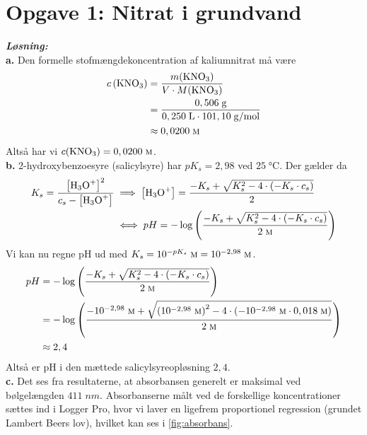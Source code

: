 \documentclass{report}
\newcommand{\sol}{\setlength{\parindent}{0cm}\textbf{\textit{Løsning:}}\setlength{\parindent}{1cm}}
\begin{document}
\section*{Opgave 1: Nitrat i grundvand}
\sol \\
\textbf{a.}
Den formelle stofmængdekoncentration af kaliumnitrat må være
\begin{equation*}
\begin{split}
  c \left(\ce{KNO3} \right) &=\frac{m(\ce{KNO3} ) }{V\cdot M(\ce{KNO3} )}\\
  &=\frac{0,506 \;\unit{g} }{0,250 \;\unit{L} \cdot 101,10 \;\unit{g/mol} }\\
  &\approx 0,0200 \;\unit{\textsc{m}} 
\end{split}
\end{equation*}
Altså har vi $c(\ce{KNO3})=0,0200 \;\unit{\textsc{m}} $.\\[1ex]
\textbf{b.}
2-hydroxybenzoesyre (salicylsyre) har $pK_s=2,98$ ved $25 \;\unit{\celsius} $.
Der gælder da
\begin{equation*}
\begin{split}
  K_s=\frac{\left[\ce{H3O+} \right]^2}{c_s-\left[\ce{H3O+} \right]} &\implies \left[\ce{H3O+} \right]=\frac{-K_s + \sqrt{K_s^2 - 4 \cdot \left(-K_s \cdot c_s\right) } }{2}\\
  &\iff pH=- \log\left(\frac{-K_s + \sqrt{K_s^2 - 4 \cdot \left(-K_s \cdot c_s\right) } }{2 \;\unit{\textsc{m}} }\right) 
\end{split}
\end{equation*}
Vi kan nu regne pH ud med $K_s=10^{-pK_s} \;\unit{\textsc{m}} =10^{-2,98} \;\unit{\textsc{m}} $.
\begin{equation*}
\begin{split}
  pH&=- \log\left(\frac{-K_s + \sqrt{K_s^2 - 4 \cdot \left(-K_s \cdot c_s\right) } }{2 \;\unit{\textsc{m}} }\right) \\
  &=- \log\left(\frac{-10 ^{-2,98} \;\unit{\textsc{m}} +\sqrt{\left(10 ^{-2,98} \;\unit{\textsc{m}} \right)^2 - 4 \cdot \left(-10 ^{-2,98} \;\unit{\textsc{m}} \cdot 0,018 \;\unit{\textsc{m}} \right) } }{2 \;\unit{\textsc{m}} }\right) \\
  &\approx 2,4
\end{split}
\end{equation*}
Altså er pH i den mættede salicylsyreopløsning $2,4$.\\[1ex]
\textbf{c.}
Det ses fra resultaterne, at absorbansen generelt er maksimal ved bølgelængden $411 \;\unit{nm} $.
Absorbanserne målt ved de forskellige koncentrationer sættes ind i Logger Pro, hvor vi laver en ligefrem proportionel regression (grundet Lambert Beers lov), hvilket kan ses i \cref{fig:absorbans}.
\end{document}
